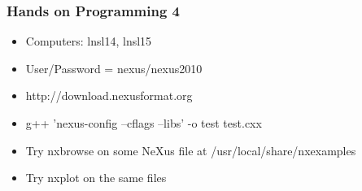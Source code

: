 \documentclass{beamer}
\begin{document}
\begin{frame}
\frametitle{Hands on Programming 4}
\begin{itemize}
\item<1->Computers: lnsl14, lnsl15
\item<1->User/Password = nexus/nexus2010
\item<1->http://download.nexusformat.org
\item<1->g++ 'nexus-config --cflags --libs' -o test test.cxx
\item<2->Try nxbrowse on some NeXus file at /usr/local/share/nxexamples
\item<3->Try nxplot on the same files
\end{itemize}
\end{frame}
\end{document}
